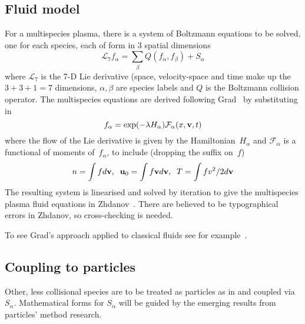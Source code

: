 \subsection{Fluid model}\label{sec:fluid1D}
For a multispecies plasma,
there is a system of Boltzmann equations to be solved, one for each species, each of form in
$3$ spatial dimensions
\begin{equation}\label{eq:mboltz}
\mathcal{L}_7 f_\alpha = \sum_\beta Q(f_\alpha, f_\beta) +S_\alpha
\end{equation}
where $\mathcal{L}_7$ is the  7-D Lie derivative (space, velocity-space and time make up the
$3+3+1=7$ dimensions, $\alpha,\beta$ are species labels and $Q$ is the Boltzmann collision operator.
The multispecies equations are derived following Grad~\cite[\S\,6]{zhdanov}
by substituting in 
\begin{equation}\label{eq:ifaexpan}
f_\alpha=\exp(-\lambda H_\alpha) \mathcal{F}_\alpha (x,{\bf v},t)
\end{equation}
where the flow of the Lie derivative is given by the Hamiltonian~$H_\alpha$
and $\mathcal{F}_\alpha$ is a functional of moments of~$f_\alpha$, to include
(dropping the suffix on~$f$)
\begin{equation}\label{eq:moments}
n=\int f d{\bf v},\;\; {\bf u}_0 = \int f {\bf v} d{\bf v},\;\; 
T=\int f v^2/2 d{\bf v}
\end{equation}
The resulting system is linearised and solved by iteration to give the multispecies
plasma fluid equations in Zhdanov~\cite[\S\,6]{zhdanov}. There are believed to be
typographical errors in Zhdanov, so cross-checking is needed.

To see Grad's approach applied to classical fluids see
for example~\cite[\S\,8]{thompson}.

\subsection{Coupling to particles}\label{sec:coupart1D}
Other, less collisional species are to be treated as particles as in  and
coupled via~$S_\alpha$. Mathematical forms for $S_\alpha$ will be guided by 
the emerging results from particles' method research.
